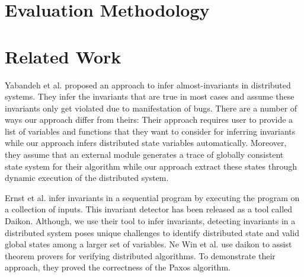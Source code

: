\section{Evaluation Methodology}



\section{Related Work}

Yabandeh et al.\cite{yabandeh2011finding} proposed an approach to
infer almost-invariants in distributed systems. They infer the
invariants that are true in most cases and assume these invariants
only get violated due to manifestation of bugs. There are a number of
ways our approach differ from theirs: Their approach requires user to
provide a list of variables and functions that they want to consider
for inferring invariants while our approach infers distributed state
variables automatically. Moreover, they assume that an external module
generates a trace of globally consistent state system for their
algorithm while our approach extract these states through dynamic
execution of the distributed system.

Ernst et al.\cite{ernst2001dynamically} infer invariants in a
sequential program by executing the program on a collection of inputs.
This invariant detector has been released as a tool called
Daikon\cite{ernst2007daikon}. Although, we use their tool to infer
invariants, detecting invariants in a distributed system poses unique
challenges to identify distributed state and valid global states among
a larger set of variables. Ne Win et al.\cite{NeWinEGKL04} use daikon
to assist theorem provers for verifying distributed algorithms. To
demonstrate their approach, they proved the correctness of the Paxos
algorithm.